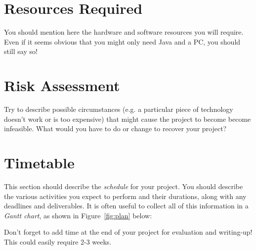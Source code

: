 \documentclass[a4paper,12pt]{article}
\begin{document}
\section*{Resources Required}

You should mention here the hardware and software resources you will
require. Even if it seems obvious that you might only need Java and a PC, 
you should still say so!


\section*{Risk Assessment}

Try to describe possible circumstances (e.g. a particular piece of
technology doesn't work or is too expensive) that might cause
the project to become become infeasible. What would you have to do
or change to recover your project?

\section*{Timetable}

This section should describe the {\em schedule} for your project. 
You should describe the various activities you expect to perform
and their durations, along with any deadlines and deliverables.
It is often useful to collect all of this information in a
{\em Gantt chart}, as shown in Figure~\ref{fig:plan} below:



Don't forget to add time at the end of your project for 
evaluation and writing-up! This could easily require 2-3 weeks.



\end{document}
